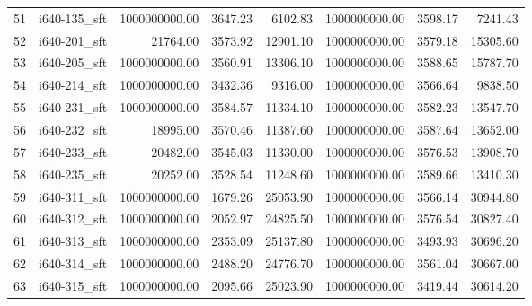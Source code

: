 \begin{tabular}{llrrrrrr}
51 &  i640-135\_sft &         1000000000.00 &                   3647.23 &             6102.83 &      1000000000.00 &                3598.17 &          7241.43 \\
52 &  i640-201\_sft &              21764.00 &                   3573.92 &            12901.10 &      1000000000.00 &                3579.18 &         15305.60 \\
53 &  i640-205\_sft &         1000000000.00 &                   3560.91 &            13306.10 &      1000000000.00 &                3588.65 &         15787.70 \\
54 &  i640-214\_sft &         1000000000.00 &                   3432.36 &             9316.00 &      1000000000.00 &                3566.64 &          9838.50 \\
55 &  i640-231\_sft &         1000000000.00 &                   3584.57 &            11334.10 &      1000000000.00 &                3582.23 &         13547.70 \\
56 &  i640-232\_sft &              18995.00 &                   3570.46 &            11387.60 &      1000000000.00 &                3587.64 &         13652.00 \\
57 &  i640-233\_sft &              20482.00 &                   3545.03 &            11330.00 &      1000000000.00 &                3576.53 &         13908.70 \\
58 &  i640-235\_sft &              20252.00 &                   3528.54 &            11248.60 &      1000000000.00 &                3589.66 &         13410.30 \\
59 &  i640-311\_sft &         1000000000.00 &                   1679.26 &            25053.90 &      1000000000.00 &                3566.14 &         30944.80 \\
60 &  i640-312\_sft &         1000000000.00 &                   2052.97 &            24825.50 &      1000000000.00 &                3576.54 &         30827.40 \\
61 &  i640-313\_sft &         1000000000.00 &                   2353.09 &            25137.80 &      1000000000.00 &                3493.93 &         30696.20 \\
62 &  i640-314\_sft &         1000000000.00 &                   2488.20 &            24776.70 &      1000000000.00 &                3561.04 &         30667.00 \\
63 &  i640-315\_sft &         1000000000.00 &                   2095.66 &            25023.90 &      1000000000.00 &                3419.44 &         30614.20 \\

\end{tabular}
